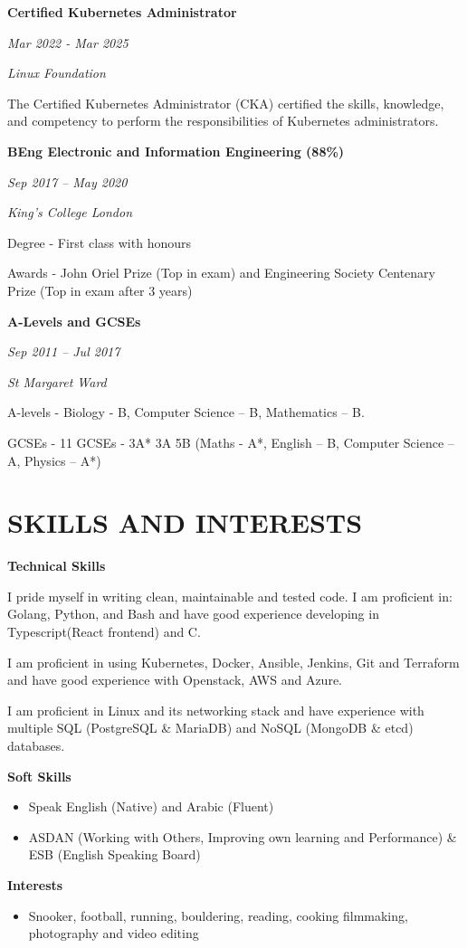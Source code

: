 \documentclass[11pt,a4paper]{article}
\newcommand{\cveducation}[6]{
    \noindent
    \begin{minipage}[t]{0.3\textwidth}
        \raggedright
        \textbf{#1}
        
        \textit{#2}
    \end{minipage}%
    \hfill
    \begin{minipage}[t]{0.7\textwidth}
        \raggedright
        \textit{#3}
        
        #4
        
        #5
        
        #6
    \end{minipage}
    
    \vspace{8pt}
}
\begin{document}
\cveducation{Certified Kubernetes Administrator}{Mar 2022 - Mar 2025}{Linux Foundation}{The Certified Kubernetes Administrator (CKA) certified the skills, knowledge, and competency to perform the responsibilities of Kubernetes administrators.}{}{}

\cveducation{BEng Electronic and Information Engineering (88\%)}{Sep 2017 – May 2020}{King's College London}{Degree - First class with honours}{Awards - John Oriel Prize (Top in exam) and Engineering Society Centenary Prize (Top in exam after 3 years)}{}

\cveducation{A-Levels and GCSEs}{Sep 2011 – Jul 2017}{St Margaret Ward}{A-levels - Biology - B, Computer Science – B, Mathematics – B.}{GCSEs - 11 GCSEs - 3A* 3A 5B (Maths - A*, English – B, Computer Science – A, Physics – A*)}{}

\section{SKILLS AND INTERESTS}

\begin{minipage}[t]{0.48\textwidth}
\textbf{Technical Skills}

I pride myself in writing clean, maintainable and tested code. I am proficient in: Golang, Python, and Bash and have good experience developing in Typescript(React frontend) and C.

I am proficient in using Kubernetes, Docker, Ansible, Jenkins, Git and Terraform and have good experience with Openstack, AWS and Azure.

I am proficient in Linux and its networking stack and have experience with multiple SQL (PostgreSQL \& MariaDB) and NoSQL (MongoDB \& etcd) databases.
\end{minipage}%
\hfill
\begin{minipage}[t]{0.48\textwidth}
\textbf{Soft Skills}
\begin{itemize}[leftmargin=15pt, itemsep=2pt]
    \item Speak English (Native) and Arabic (Fluent)
    \item ASDAN (Working with Others, Improving own learning and Performance) \& ESB (English Speaking Board)
\end{itemize}

\textbf{Interests}
\begin{itemize}[leftmargin=15pt, itemsep=2pt]
    \item Snooker, football, running, bouldering, reading, cooking filmmaking, photography and video editing
\end{itemize}

\end{minipage}
\end{document}
